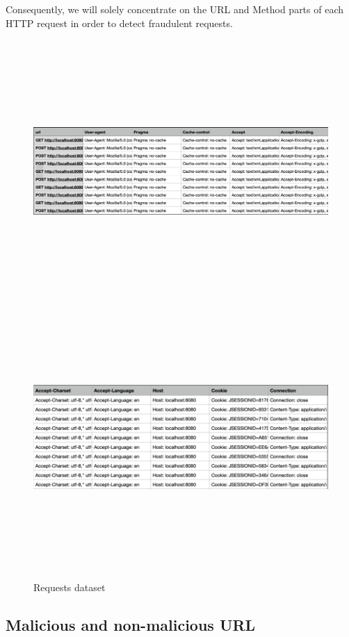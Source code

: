 Consequently, we will solely concentrate on the URL and Method parts of each HTTP request in order to detect fraudulent requests.

\begin{figure}[!h]
	\centering
	\includegraphics[width=\linewidth, height=10cm,keepaspectratio]{figures/dataset part1.PNG}
	\includegraphics[width=\linewidth, height=10cm,keepaspectratio]{figures/dataset part2.PNG}
  \caption{Requests dataset}
\end{figure}

\newpage
\subsection{Malicious and non-malicious URL}

